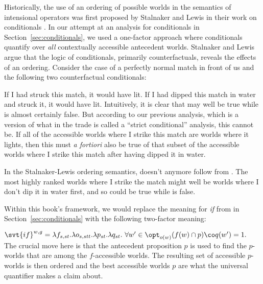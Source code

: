 %
Historically, the use of an ordering of possible worlds in the semantics of
intensional operators was first proposed by Stalnaker and Lewis in their work
on conditionals \parencite{stalnaker-1968-theory,lewis-1973-counterfactuals}. In
our attempt at an analysis for conditionals in Section~\ref{sec:conditionals},
we used a one-factor approach where conditionals quantify over \emph{all}
contextually accessible antecedent worlds. Stalnaker and Lewis argue that the
logic of conditionals, primarily counterfactuals, reveals the effects of an
ordering. %
%
Consider the case of a perfectly normal match in front of us and the following
two counterfactual conditionals:

\pex
\a If I had struck this match, it would have lit.
\a If I had dipped this match in water and struck it, it would have lit.
\xe
%
Intuitively, it is clear that \Last[a] may well be true while \Last[b] is almost
certainly false. But according to our previous analysis, which is a version of
what in the trade is called a ``strict conditional'' analysis, this cannot be.
If all of the accessible worlds where I strike this match are worlds where it
lights, then this must \emph{a fortiori} also be true of that subset of the
accessible worlds where I strike this match after having dipped it in water.

In the Stalnaker-Lewis ordering semantics, \Last[b] doesn't anymore follow from
\Last[a]. The most highly ranked worlds where I strike the match might well be
worlds where I don't dip it in water first, and so \Last[a] could be true while
\Last[b] is false.

Within this book's framework, we would replace the meaning for \emph{if} from
 in Section~\ref{sec:conditionals} with the
following two-factor meaning:

\ex
$\svt{if}^{w,g} = \lambda f_{s,st}.\lambda o_{s,stt}.\lambda p_{st}.\lambda
q_{st}.\ \forall w'\in \opt_{o(w)}(f(w) \cap p)\co q(w')=1.$
\xe
%
The crucial move here is that the antecedent proposition $p$ is used to find the
$p$-worlds that are among the $f$-accessible worlds. The resulting set of
accessible $p$-worlds is then ordered and the best accessible worlds $p$ are
what the universal quantifier makes a claim about.


